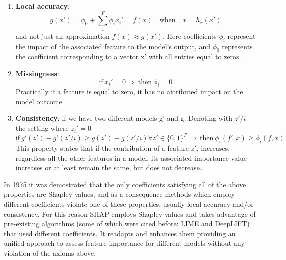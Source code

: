 \documentclass[10pt]{report}
\begin{document}
\begin{enumerate}
\item \textbf{Local accuracy}:
\begin{equation}
g(x') =\phi_0 + \sum_i^F \phi_i x_i' \mathbf{=} f(x) \quad \text{when} \quad x = h_x(x')
\end{equation} and not just an approximation $f(x) \approx g(x')$. Here coefficients $\phi_i$ represent the impact of the associated feature to the model's output, and $\phi_0$ represents the coefficient corresponding to a vector x' with all entries equal to zeros.
\item \textbf{Missingness}:
\begin{equation}
\text{if} \ x_i' = 0 \Longrightarrow \ \text{then} \ \phi_i = 0
\end{equation}
Practically if a feature is equal to zero, it has no attributed impact on the model outcome
\item \textbf{Consistency}: if we have two different models g' and g. Denoting with $z' / i$ the setting where $z_i' = 0$
\begin{equation}
\text{if} \ g'(z') - g'(z' / i) \ge g(z') - g(z' / i) \forall z' \in \{0, 1\}^F \Longrightarrow \ \text{then} \ \phi_i(f', x) \ge \phi_i(f, x)
\end{equation}
This property states that if the contribution of a feature $z'_i$ increases, regardless all the other features in a model, its associated importance value increases or at least remain the same, but does not decrease.
\end{enumerate}

In 1975 it was demostrated \cite{young1985} that the only coefficients satisfying all of the above properties are Shapley values, and as a consequence methods which employ different coefficients violate one of these properties, usually local accuracy and/or consistency.
For this reason SHAP employs Shapley values and takes advantage of pre-existing algorithms (some of which were cited before: LIME and DeepLIFT) that used different coefficients. It readapts and enhances them providing an unified approach to assess feature importance for different models without any violation of the axioms above.
\end{document}
